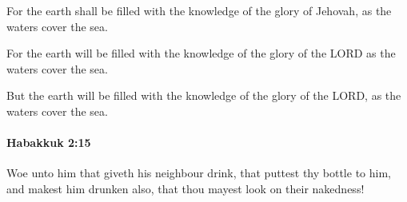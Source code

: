 			\begin{versebox}
					\item[BHS] 
					\item[LXX] 
					\item[ASV] For the earth shall be filled with the knowledge of the glory of Jehovah, as the waters cover the sea.
					\item[NIV] For the earth will be filled with the knowledge of the glory of the LORD as the waters cover the sea.
					\item[NRSV] But the earth will be filled with the knowledge of the glory of the LORD, as the waters cover the sea.
			\end{versebox}

		\paragraph{Habakkuk 2:15} %
			\label{HABAKKUK-2-15}

			Woe unto him that giveth his neighbour drink, that puttest thy bottle to him, and makest him drunken also, that thou mayest look on their nakedness!

